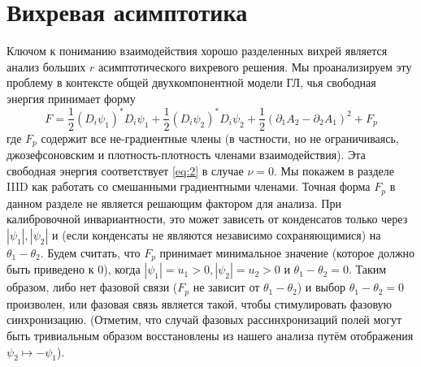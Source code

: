 \chapter{Вихревая асимптотика}
\label{ch:3}

Ключом к пониманию взаимодействия хорошо разделенных вихрей является анализ  
больших \( r \) асимптотического вихревого решения. Мы проанализируем эту 
проблему в контексте общей двухкомпонентной модели ГЛ, чья свободная энергия 
принимает форму
\begin{equation}
    F = \frac{1}{2}\left( D_i \psi_1 \right)^{*} D_i \psi_1 + 
        \frac{1}{2}\left( D_i \psi_2 \right)^{*} D_i \psi_2 + 
        \frac{1}{2}\left( \partial_1 A_2 - \partial_2 A_1 \right)^2 + F_p
    \label{eq:3}
\end{equation}
где \( F_p \) содержит все не-градиентные члены (в частности, но не 
ограничиваясь, джозефсоновским и плотность-плотность членами взаимодействия). 
Эта свободная энергия соответствует \eqref{eq:2} в случае \( \nu = 0 \). Мы 
покажем в разделе IIID как работать со смешанными градиентными членами. Точная 
форма \( F_p \) в данном разделе не является решающим фактором для анализа.
При калибровочной инвариантности, это может зависеть от конденсатов только 
через \( |\psi_1|, |\psi_2| \) и (если конденсаты не являются независимо 
сохраняющимися) на \( \theta_1 - \theta_2 \). Будем считать, что \( F_p \) 
принимает минимальное значение (которое должно быть приведено к 0), когда 
\( |\psi_1| = u_1 > 0, |\psi_2| = u_2 > 0 \) и \( \theta_1 - \theta_2 = 0 \).
Таким образом, либо нет фазовой связи (\( F_p \) не зависит от 
\( \theta_1 - \theta_2 \)) и выбор \( \theta_1 - \theta_2 = 0 \) произволен, 
или фазовая связь является такой, чтобы стимулировать фазовую синхронизацию.
(Отметим, что случай фазовых рассинхронизаций полей могут быть тривиальным 
образом восстановлены из нашего анализа путём отображения 
\( \psi_2 \mapsto -\psi_1 \)).

